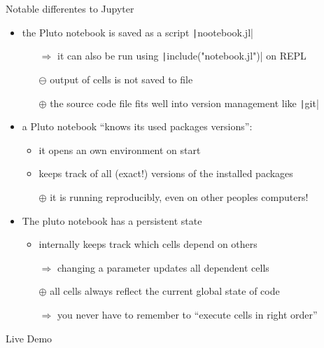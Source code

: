 \documentclass[aspectratio=169, 12pt]{beamer}
\begin{document}
    \begin{frame}{Notable differentes to Jupyter}
        \begin{itemize}[<+->]
            \item the Pluto notebook is saved as a script \texttt|nootebook.jl|
            \begin{itemize}
                \item[$\Rightarrow$] it can also be run using \texttt|include("notebook.jl")| on REPL
                \item[{$\ominus$}] output of cells is not saved to file
                \item[{$\oplus$}] the source code file fits well into version management like \texttt|git|
            \end{itemize}
            \item a Pluto notebook “knows its used packages versions”:
            \begin{itemize}[<+->]
                \item it opens an own environment on start
                \item keeps track of all (exact!) versions of the installed packages
                \item[$\oplus$] it is running reproducibly, even on other peoples computers!
            \end{itemize}
            \item The pluto notebook has a \alert{persistent state}
            \begin{itemize}
                \item internally keeps track which cells depend on others
                \item[$\Rightarrow$] changing a parameter updates \alert{all} dependent cells
                \item[$\oplus$] all cells always reflect the current global state of code
                \item[$\Rightarrow$] you never have to remember to “execute cells in right order”
            \end{itemize}
        \end{itemize}
    \end{frame}
    \begin{frame}{Live Demo}
    \end{frame}
\end{document}
